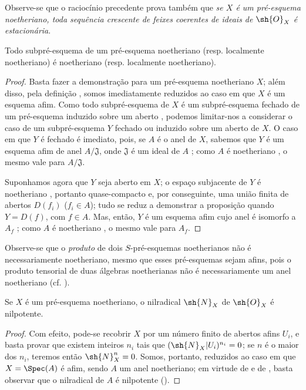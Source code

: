 \documentclass[oneside]{amsart}
\newcommand{\oldpage}[2][]{{\marginnote{\normalfont\textbf{#1}~|~#2}}\ignorespaces}
\let\EGAOriginalLabel\label
\renewcommand{\label}[1]{\phantomsection\EGAOriginalLabel{#1}}
\begin{document}
Observe-se que o raciocínio precedente prova também que \emph{se $X$ é um
pré-esquema noetheriano, toda sequência crescente de feixes coerentes de
ideais de $\sh{O}_X$ é estacionária}.

\begin{proposition}[6.1.4]
\label{I.6.1.4}
Todo subpré-esquema de um pré-esquema noetheriano (resp. localmente
noetheriano) é noetheriano (resp. localmente noetheriano).
\end{proposition}

\begin{proof}
Basta fazer a demonstração para um pré-esquema noetheriano $X$; além disso,
pela definição , somos imediatamente reduzidos ao caso em que
$X$ é um esquema afim. Como todo subpré-esquema de $X$ é um subpré-esquema
fechado de um pré-esquema induzido sobre um aberto , podemos
limitar-nos a considerar o caso de um subpré-esquema $Y$ fechado ou induzido
sobre um aberto de $X$. O caso em que $Y$ é fechado é imediato, pois, se $A$
é o anel de $X$, sabemos que $Y$ é um esquema afim de anel
$A/\mathfrak{J}$, onde $\mathfrak{J}$ é um ideal de $A$
; como $A$ é noetheriano , o mesmo vale para
$A/\mathfrak{J}$.

Suponhamos agora que $Y$ seja aberto em $X$; o espaço subjacente de $Y$ é
noetheriano , portanto quase-compacto e, por conseguinte, uma
união finita de abertos $D(f_i)$ ($f_i\in A$);
\oldpage[I]{142}
tudo se reduz a demonstrar a proposição quando $Y=D(f)$, com $f\in A$. Mas,
então, $Y$ é um esquema afim cujo anel é isomorfo a $A_f$
; como $A$ é noetheriano , o mesmo vale para
$A_f$.
\end{proof}

\begin{env}[6.1.5]
\label{I.6.1.5}
Observe-se que o \emph{produto} de dois $S$-pré-esquemas noetherianos não é
necessariamente noetheriano, mesmo que esses pré-esquemas sejam afins, pois o
produto tensorial de duas álgebras noetherianas não é necessariamente um anel
noetheriano (cf. ).
\end{env}

\begin{proposition}[6.1.6]
\label{I.6.1.6}
Se $X$ é um pré-esquema noetheriano, o nilradical $\sh{N}_X$ de
$\sh{O}_X$ é nilpotente.
\end{proposition}

\begin{proof}
Com efeito, pode-se recobrir $X$ por um número finito de abertos afins $U_i$,
e basta provar que existem inteiros $n_i$ tais que
$(\sh{N}_X|U_i)^{n_i}=0$; se $n$ é o maior dos $n_i$, teremos então
$\sh{N}_X^n=0$. Somos, portanto, reduzidos ao caso em que $X=\Spec(A)$ é
afim, sendo $A$ um anel noetheriano; em virtude de  e de
, basta observar que o nilradical de $A$ é nilpotente
(\cite[p.~127, cor.~4]{I-11}).
\end{proof}
\end{document}

